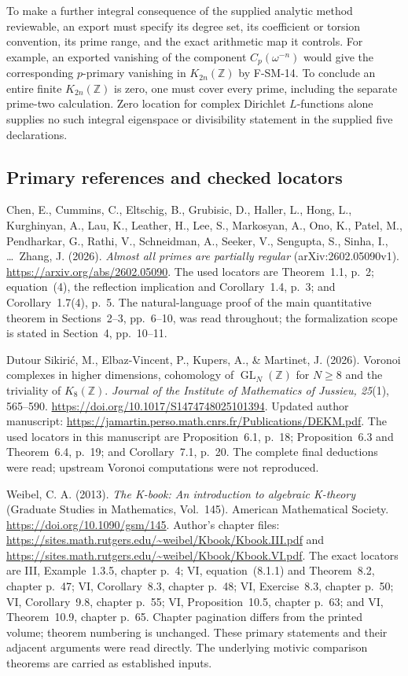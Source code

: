\documentclass[11pt,a4paper]{article}
\theoremstyle{definition}\newtheorem{definition}[theorem]{Definition}
\theoremstyle{remark}\newtheorem{remark}[theorem]{Remark}
\begin{document}
To make a further integral consequence of the supplied analytic method
reviewable, an export must specify its degree set, its coefficient or
torsion convention, its prime range, and the exact arithmetic map it
controls.  For example, an exported vanishing of the component
$C_p(\omega^{-n})$ would give the corresponding $p$-primary vanishing
in $K_{2n}(\mathbb Z)$ by F-SM-14.  To conclude an entire finite
$K_{2n}(\mathbb Z)$ is zero, one must cover every prime, including the
separate prime-two calculation.  Zero location for complex Dirichlet
$L$-functions alone supplies no such integral eigenspace or
divisibility statement in the supplied five declarations.

\subsection{Primary references and checked locators}

Chen, E., Cummins, C., Eltschig, B., Grubisic, D., Haller, L.,
Hong, L., Kurghinyan, A., Lau, K., Leather, H., Lee, S.,
Markosyan, A., Ono, K., Patel, M., Pendharkar, G., Rathi, V.,
Schneidman, A., Seeker, V., Sengupta, S., Sinha, I., \ldots\
Zhang, J. (2026).
\emph{Almost all primes are partially regular}
(arXiv:2602.05090v1).
\url{https://arxiv.org/abs/2602.05090}.
The used locators are Theorem~1.1, p.~2; equation~(4),
the reflection implication and Corollary~1.4, p.~3; and
Corollary~1.7(4), p.~5.  The natural-language proof of the main
quantitative theorem in Sections~2--3, pp.~6--10, was read throughout;
the formalization scope is stated in Section~4, pp.~10--11.

Dutour Sikiri\'c, M., Elbaz-Vincent, P., Kupers, A., \& Martinet, J.
(2026). Voronoi complexes in higher dimensions, cohomology of
$\operatorname{GL}_N(\mathbb Z)$ for $N\geq8$ and the triviality of
$K_8(\mathbb Z)$.
\emph{Journal of the Institute of Mathematics of Jussieu, 25}(1),
565--590.
\url{https://doi.org/10.1017/S1474748025101394}.
Updated author manuscript:
\url{https://jamartin.perso.math.cnrs.fr/Publications/DEKM.pdf}.
The used locators in this manuscript are Proposition~6.1, p.~18;
Proposition~6.3 and Theorem~6.4, p.~19; and Corollary~7.1, p.~20.
The complete final deductions were read; upstream Voronoi
computations were not reproduced.

Weibel, C. A. (2013).
\emph{The K-book: An introduction to algebraic K-theory}
(Graduate Studies in Mathematics, Vol.~145).
American Mathematical Society.
\url{https://doi.org/10.1090/gsm/145}.
Author's chapter files:
\url{https://sites.math.rutgers.edu/~weibel/Kbook/Kbook.III.pdf}
and
\url{https://sites.math.rutgers.edu/~weibel/Kbook/Kbook.VI.pdf}.
The exact locators are III, Example~1.3.5, chapter p.~4;
VI, equation~(8.1.1) and Theorem~8.2, chapter p.~47;
VI, Corollary~8.3, chapter p.~48; VI, Exercise~8.3, chapter p.~50;
VI, Corollary~9.8, chapter p.~55; VI, Proposition~10.5,
chapter p.~63; and VI, Theorem~10.9, chapter p.~65.
Chapter pagination differs from the printed volume; theorem
numbering is unchanged.  These primary statements and their
adjacent arguments were read directly.  The underlying motivic
comparison theorems are carried as established inputs.
\end{document}
